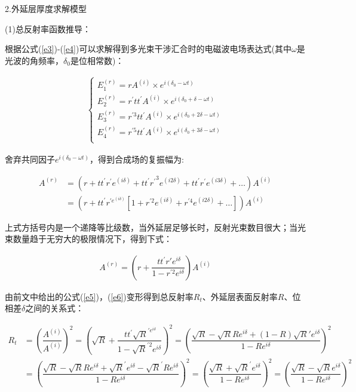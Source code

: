\documentclass[UTF8]{ctexart}
\begin{document}
2.外延层厚度求解模型\par 
(1)总反射率函数推导：\par 
根据公式(\ref{e3})-(\ref{e4})可以求解得到多光束干涉汇合时的电磁波电场表达式(其中$\omega$是光波的角频率，$\delta_0$是位相常数)：\par 
\begin{align}
	\begin{cases}
		E_1^{(r)}=rA^{(i)}\times e^{i(\delta_0-\omega t)}\\
		E_2^{(r)}=r^\prime tt^\prime A^{(i)}\times e^{i(\delta_0+\delta-\omega t)}\\
		E_3^{(r)}=r^{\prime3}tt^\prime A^{(i)}\times e^{i(\delta_0+2\delta-\omega t)}\\
		E_4^{(r)}=r^{\prime5}tt^\prime A^{(i)}\times e^{i(\delta_0+3\delta-\omega t)}\\
		\label{e7}
	\end{cases}
\end{align}\par 
舍弃共同因子$e^{i(\delta_0-\omega t)}$，得到合成场的复振幅为:\par 
\begin{align}
	A^{(r)}&=(r+tt^\prime r^\prime e^{(i\delta)}+tt^\prime{r^\prime}^3e^{(i2\delta)}+tt^\prime r^\prime e^{(i3\delta)}+\ldots)A^{(i)}\\
	&=(r+tt^\prime r^{\prime e^{(i\delta)}}[1+r^{\prime2}e^{(i\delta)}+r^{\prime4}e^{(i2\delta)}+\ldots])A^{(i)}
	\label{e8}
\end{align}\par 
上式方括号内是一个递降等比级数，当外延层足够长时，反射光束数目很大；当光束数量趋于无穷大的极限情况下，得到下式：\par 
\begin{align}
	A^{(r)}=(r+\dfrac{\ tt^\prime r\prime e^{i\delta}}{1-r^{\prime2}e^{i\delta}})A^{(i)}
\end{align}\par 
由前文中给出的公式(\ref{e5})，(\ref{e6})变形得到总反射率$R_t$、外延层表面反射率$R$、位相差$\delta$之间的关系式：\par 
\begin{align}
	R_t&=(\dfrac{A^{(i)}}{A^{(i)}})^2=(\sqrt{R}+\dfrac{\ tt^\prime \sqrt{R}^{\prime e^{i\delta}}}{1-\sqrt{R}^{\prime2}e^{i\delta}})^2=(\dfrac{\sqrt{R}-\sqrt{R}Re^{i\delta}+(1-R)\sqrt{R}\prime e^{i\delta}}{1-Re^{i\delta}})^2\\
	&=(\dfrac{\sqrt{R}-\sqrt{R}Re^{i\delta}+\sqrt{R}^\prime e^{i\delta}-\sqrt{R}^\prime R e^{i\delta}}{1-Re^{i\delta}})^2=(\dfrac{\sqrt{R}+\sqrt{R}^\prime e^{i\delta}}{1-Re^{i\delta}})^2=(\dfrac{\sqrt{R}-\sqrt{R}e^{i\delta}}{1-Re^{i\delta}})^2
	\label{e9}
\end{align}\par 
\end{document}
